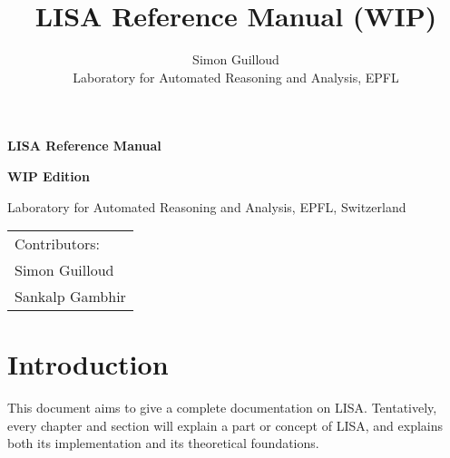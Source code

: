 \documentclass[11pt,a4paper]{book}
\title{LISA Reference Manual (WIP)}
\author{Simon Guilloud\\Laboratory for Automated Reasoning and Analysis, EPFL}
\date{}
\begin{document}
\newfontfamily{}

\begin{titlepage}
\titlefont 

    \begin{center}
        \vspace*{1cm}
 
        \textbf{\Huge LISA Reference Manual}
             
        \vspace{1.5cm}
        
        \textbf{\large WIP Edition}
             
        \vspace{1.5cm}
 
        {\Large Laboratory for Automated Reasoning and Analysis, EPFL, Switzerland}

        \vspace{1.5cm}

        \date{}

    \end{center}
    \vspace*{10em}
    \begin{flushright}\huge
        \begin{tabular}{l}
         Contributors: \hspace*{2em} \\[1em]
         Simon Guilloud\\
         Sankalp Gambhir
        \end{tabular}
    \end{flushright}
             
 \end{titlepage}
\chapter*{Introduction}

This document aims to give a complete documentation on LISA. Tentatively, every chapter and section will explain a part or concept of LISA, and explains both its implementation and its theoretical foundations. 

\tableofcontents











\end{document}
